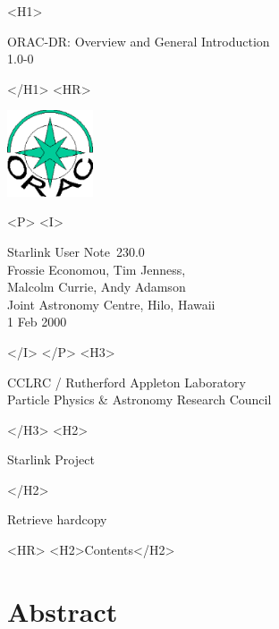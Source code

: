 \documentclass[twoside,11pt]{article}
\newcommand{\stardoccategory}  {Starlink User Note}
\newcommand{\stardocsource}    {sun\stardocnumber}
\newcommand{\stardocnumber}    {230.0}
\newcommand{\stardocauthors}   {Frossie Economou, Tim Jenness,\\ Malcolm Currie, Andy Adamson\\
Joint Astronomy Centre, Hilo, Hawaii}
\newcommand{\stardocdate}      {1 Feb 2000}
\newcommand{\stardoctitle}     {ORAC-DR: Overview and General Introduction}
\newcommand{\stardocversion}   {1.0-0}
\newcommand{\stardocmanual}    {}
\newcommand{\htmladdnormallink}[2]{#1}
\newcommand{\htmladdimg}[1]{}
\newcommand{\htmlref}[2]{#1}
\newcommand{\htmladdtonavigation}[1]{}
\newcommand{\xlabel}[1]{}
\renewcommand{\_}{\texttt{\symbol{95}}}
\begin{document}
\begin{htmlonly}
   \xlabel{}
   \begin{rawhtml} <H1> \end{rawhtml}
      \stardoctitle\\
      \stardocversion\\
      \stardocmanual
   \begin{rawhtml} </H1> <HR> \end{rawhtml}

\includegraphics[width=1.0in]{sun230_logo.eps}

   \begin{rawhtml} <P> <I> \end{rawhtml}
   \stardoccategory\ \stardocnumber \\
   \stardocauthors \\
   \stardocdate
   \begin{rawhtml} </I> </P> <H3> \end{rawhtml}
      \htmladdnormallink{CCLRC / Rutherford Appleton Laboratory}
                        {http://www.cclrc.ac.uk} \\
      \htmladdnormallink{Particle Physics \& Astronomy Research Council}
                        {http://www.pparc.ac.uk} \\
   \begin{rawhtml} </H3> <H2> \end{rawhtml}
      \htmladdnormallink{Starlink Project}{http://www.starlink.rl.ac.uk/}
   \begin{rawhtml} </H2> \end{rawhtml}
   \htmladdnormallink{\htmladdimg{source.gif} Retrieve hardcopy}
      {http://www.starlink.rl.ac.uk/cgi-bin/hcserver?\stardocsource}\\

  \label{stardoccontents}
  \begin{rawhtml} 
    <HR>
    <H2>Contents</H2>
  \end{rawhtml}
  \htmladdtonavigation{\htmlref{\htmladdimg{contents_motif.gif}}
        {stardoccontents}}

  \section{\xlabel{abstract}Abstract}
\end{htmlonly}
\end{document}
